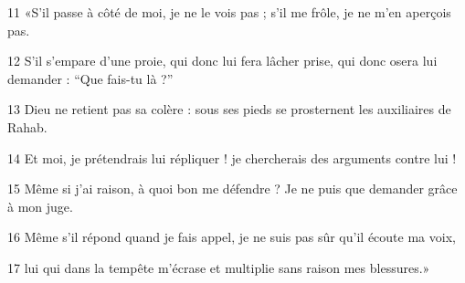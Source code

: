 
11 «S’il passe à côté de moi, je ne le vois pas ; s’il me frôle, je ne m’en aperçois pas.

12 S’il s’empare d’une proie, qui donc lui fera lâcher prise, qui donc osera lui demander : “Que fais-tu là ?”

13 Dieu ne retient pas sa colère : sous ses pieds se prosternent les auxiliaires de Rahab.

14 Et moi, je prétendrais lui répliquer ! je chercherais des arguments contre lui !

15 Même si j’ai raison, à quoi bon me défendre ? Je ne puis que demander grâce à mon juge.

16 Même s’il répond quand je fais appel, je ne suis pas sûr qu’il écoute ma voix,

17 lui qui dans la tempête m’écrase et multiplie sans raison mes blessures.»